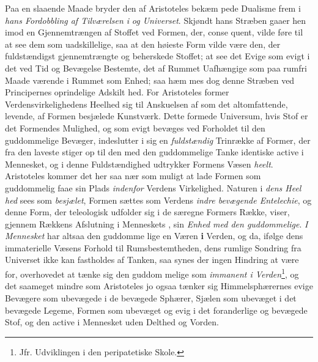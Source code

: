 Paa en slaaende Maade bryder den af Aristoteles bekæm\-%
pede Dualisme frem i \emph{hans Fordobbling af Tilværelsen
i} \emph{} \emph{og Universet}. Skjøndt hans Stræben gaaer hen
imod en Gjennemtrængen af Stoffet ved Formen, der, conse\-%
quent, vilde føre til at see dem som uadskillelige, saa at den
 \setcounter{footnote}{0}
høieste Form vilde være den, der fuldstændigst gjennemtrængte
og beherskede Stoffet; at see det Evige som evigt i det ved
Tid og Bevægelse Bestemte, det af Rummet Uafhængige som
paa rumfri Maade værende i Rummet som Enhed; saa hæm\-%
mes dog denne Stræben ved Principernes oprindelige Adskilt\-%
hed. For Aristoteles former Verdensvirkelighedens Heelhed sig
til Anskuelsen af  som det altomfattende, levende, af
Formen besjælede Kunstværk. Dette formede Universum, hvis
Stof er det Formendes Mulighed, og som evigt bevæges ved
Forholdet til den guddommelige Bevæger, indeslutter i sig en
\emph{fuldstændig} Trinrække af Former, der fra den laveste stiger
op til den med den guddommelige Tanke identiske active
 i Mennesket, og i denne Fuldstændighed udtrykker
Formens Væsen \emph{heelt}. Aristoteles kommer det her saa nær
som muligt at lade Formen som guddommelig  faae sin
Plads \emph{indenfor} Verdens Virkelighed. Naturen i \emph{dens Heel\-%
hed} sees som \emph{besjælet}, Formen sættes som Verdens \emph{indre
bevægende Entelechie}, og denne Form, der teleologisk
udfolder sig i de særegne Formers Række, viser, gjennem
Rækkens Afslutning i Menneskets , sin \emph{Enhed med den
guddommelige}. \emph{I Mennesket} har altsaa den guddomme\-%
lige  en Væren \textbf{i} Verden, og da, ifølge dens immaterielle
Væsens Forhold til Rumsbestemtheden, dens rumlige Sondring fra
Universet ikke kan fastholdes af Tanken, saa synes der ingen
Hindring at være for, overhovedet at tænke sig den guddom\-%
melige  som \emph{immanent i Verden}\footnote{Jfr. Udviklingen
i den peripatetiske Skole.}, og det saameget
mindre som Aristoteles jo ogsaa tænker sig Himmelsphærernes
evige Bevægere som ubevægede i de bevægede Sphærer, Sjælen
som ubevæget i det bevægede Legeme, Formen som ubevæget
og evig i det foranderlige og bevægede Stof, og den active
 i Mennesket uden Delthed og Vorden.

